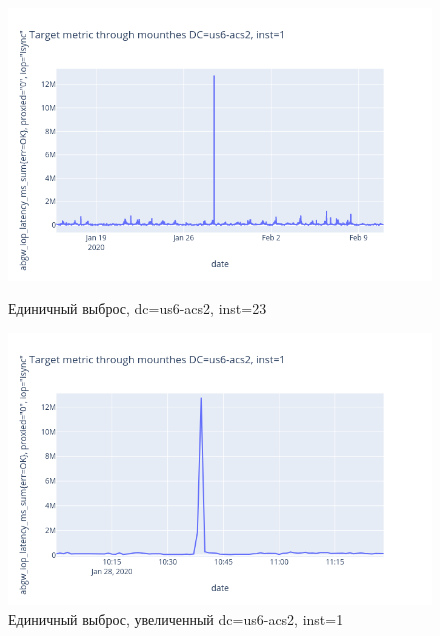 \documentclass[14pt, a4paper]{extarticle}
\begin{document}
	\begin{figure}[!htb]
		\includegraphics[width=\linewidth]{Figures/outlier.png}
		\caption{Единичный выброс, dc=us6-acs2, inst=23}\label{fig:outlier}
		\endminipage\hfill
		\includegraphics[width=\linewidth]{Figures/outlier_but_closer.png}
		\caption{Единичный выброс, увеличенный dc=us6-acs2, inst=1}\label{fig:outlier_closer}
		\endminipage
	\end{figure}
	
\end{document}
